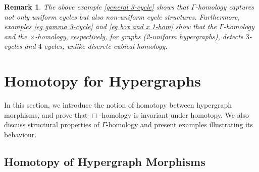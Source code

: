 \documentclass[11pt]{amsart}
\newtheorem{rem}[subsection]{Remark}
\newtheorem{prop}[subsection]{Proposition}
\begin{document}
\begin{rem}
The above example \ref{general 3-cycle} shows that $\Gamma$-homology captures not only uniform cycles but also non-uniform cycle structures. Furthermore,  examples \ref{eg gamma 3-cycle} and \ref{eg box and x 1-hom} show that the $\Gamma$-homology and the $\times$-homology, respectively, for graphs (2-uniform hypergraphs), detects $3$-cycles and $4$-cycles, unlike discrete cubical homology. 
\end{rem}


\section{Homotopy for Hypergraphs}\label{hmtpy}

In this section, we introduce the notion of homotopy between hypergraph morphisms, and prove that $\Box$-homology is invariant under homotopy. We also discuss structural properties of $\Gamma$-homology and present examples illustrating its behaviour.




\subsection{Homotopy of Hypergraph Morphisms}
\end{document}
